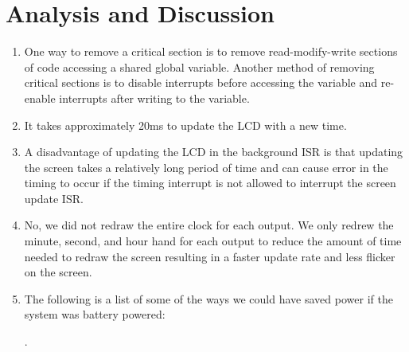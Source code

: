 \documentclass{article}
\begin{document}

\section{Analysis and Discussion}

	\begin{enumerate}
		\item %
			One way to remove a critical section is to remove read-modify-write sections of code accessing a shared global variable. Another method of removing critical sections is to disable interrupts before accessing the variable and re-enable interrupts after writing to the variable.
			
		\item %
			It takes approximately 20ms to update the LCD with a new time.
					
		\item %
			A disadvantage of updating the LCD in the background ISR is that updating the screen takes a relatively long period of time and can cause error in the timing to occur if the timing interrupt is not allowed to interrupt the screen update ISR.
		
		\item %
			No, we did not redraw the entire clock for each output. We only redrew the minute, second, and hour hand for each output to reduce the amount of time needed to redraw the screen resulting in a faster update rate and less flicker on the screen.
						
		\item %
			The following is a list of some of the ways we could have saved power if the system was battery powered:
			.
	\end{enumerate}
\end{document}
